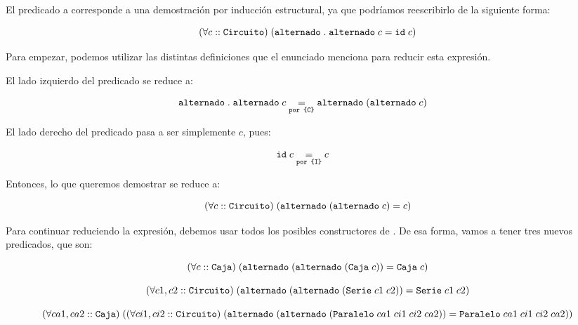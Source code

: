 El predicado a corresponde a una demostración por inducción estructural, ya que podríamos reescribirlo de la siguiente forma:

$$\paraTodo{c}{\circuito}{\alternado \composition \alternado \; c = \textito{id} \; c}$$

Para empezar, podemos utilizar las distintas definiciones que el enunciado menciona para reducir esta expresión.

El lado izquierdo del predicado se reduce a:

\begin{equation*}
    \begin{aligned}
        \igualesPor{\alternado \composition \alternado \; c}{\alternado \; (\alternado \; c)}{por \formula{C}}
    \end{aligned}
\end{equation*}

El lado derecho del predicado pasa a ser simplemente $c$, pues:

\begin{equation*}
    \begin{aligned}
        \igualesPor{\textito{id} \; c}{c}{por \formula{I}}
    \end{aligned}
\end{equation*}

Entonces, lo que queremos demostrar se reduce a:

$$\paraTodo{c}{\circuito}{\alternado \; (\alternado \; c) = c}$$

Para continuar reduciendo la expresión, debemos usar todos los posibles constructores de \circuito. De esa forma, vamos a tener tres nuevos predicados, que son:

\begin{equation*}
    \paraTodo{c}{\caja}{\alternado \; (\alternado \; (\caja \; c)) = \caja \; c}
\end{equation*}

\begin{equation*}
    \paraTodo{c1, c2}{\circuito}{\alternado \; (\alternado \; (\serie{c1}{c2})) = \serie{c1}{c2}}
\end{equation*}

\begin{scriptsize}
    \begin{equation*}
        \paraTodo{ca1, ca2}{\caja}{\paraTodo{ci1, ci2}{\circuito}{\alternado \; (\alternado \; (\paralelo{ca1}{ci1}{ci2}{ca2})) = \paralelo{ca1}{ci1}{ci2}{ca2}}}
    \end{equation*}
\end{scriptsize}

